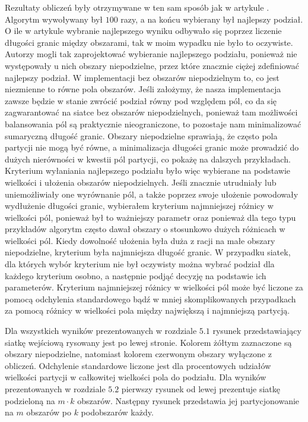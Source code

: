 Rezultaty obliczeń były otrzymywane w ten sam sposób jak w artykule \cite{1364754}.
Algorytm wywoływany był $100$ razy, a na końcu wybierany był najlepszy podział.
O ile w artykule \cite{1364754} wybranie najlepszego wyniku odbywało się poprzez liczenie długości granic między obszarami,
tak w moim wypadku nie było to oczywiste.
Autorzy \cite{1364754} mogli tak zaprojektować wybieranie najlepszego podziału, ponieważ nie występowały u nich
obszary niepodzielne, przez które znacznie ciężej zdefiniować najlepszy podział.
W implementacji bez obszarów niepodzielnym to, co jest niezmienne to równe pola obszarów.
Jeśli założymy, że nasza implementacja zawsze będzie w stanie zwrócić podział równy pod względem pól,
co da się zagwarantować na siatce bez obszarów niepodzielnych, ponieważ tam możliwości balansowania
pól są praktycznie nieograniczone, to pozostaje nam minimalizować sumaryczną długość granic.
Obszary niepodzielne sprawiają, że często pola partycji nie mogą być równe, a minimalizacja długości granic może
prowadzić do dużych nierówności w kwestii pól partycji, co pokażę na dalszych przykładach.
Kryterium wyłaniania najlepszego podziału było więc wybierane na podstawie wielkości i ułożenia obszarów niepodzielnych.
Jeśli znacznie utrudniały lub uniemożliwiały one wyrównanie pól, a także poprzez swoje ułożenie powodowały wydłużenie długości granic,
wybierałem kryterium najmniejszej różnicy w wielkości pól, ponieważ był to ważniejszy parametr oraz
ponieważ dla tego typu przykładów algorytm często dawał obszary o stosunkowo dużych różnicach w wielkości pól.
Kiedy dowolność ułożenia była duża z racji na małe obszary niepodzielne, kryterium była najmniejsza długość granic.
W przypadku siatek, dla których wybór kryterium nie był oczywisty można wybrać podział dla każdego kryterium osobno,
a następnie podjąć decyzję na podstawie ich parameterów.
Kryterium najmniejszej różnicy w wielkości pól może być liczone za pomocą odchylenia standardowego bądź w mniej
skomplikowanych przypadkach
za pomocą różnicy w wielkości pola między największą i najmniejszą partycją.

Dla wszystkich wyników prezentowanych w rozdziale $5.1$ rysunek przedstawiający siatkę wejściową rysowany jest po lewej stronie.
Kolorem żółtym zaznaczone są obszary niepodzielne, natomiast kolorem czerwonym obszary wyłączone z obliczeń.
Odchylenie standardowe liczone jest dla procentowych udziałów wielkości partycji w całkowitej wielkości pola do podziału.
Dla wyników prezentowanych w rozdziale $5.2$ pierwszy rysunek od lewej prezentuje siatkę podzieloną na $m \cdot k$ obszarów.
Następny rysunek przedstawia jej partycjonowanie na $m$ obszarów po $k$ podobszarów każdy.
\vspace{-5mm}